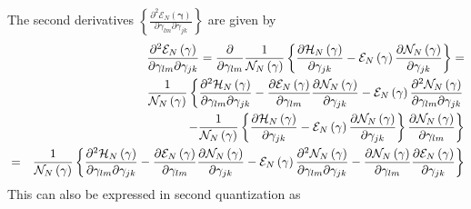 \documentclass[aps,preprint]{revtex4}
\begin{document}
The second derivatives $\left\{ \frac{\partial ^{2}\mathcal{E}_{N}\left( 
\mathbf{\gamma }\right) }{\partial \gamma _{lm}\partial \gamma _{jk}}%
\right\} $ are given by 
\begin{eqnarray}
&&\frac{\partial ^{2}\mathcal{E}_{N}\left( \mathbf{\gamma }\right) }{%
\partial \gamma _{lm}\partial \gamma _{jk}}=\frac{\partial }{\partial \gamma
_{lm}}\frac{1}{\mathcal{N}_{N}\left( \mathbf{\gamma }\right) }\left\{ \frac{%
\partial \mathcal{H}_{N}\left( \mathbf{\gamma }\right) }{\partial \gamma
_{jk}}-\mathcal{E}_{N}\left( \mathbf{\gamma }\right) \frac{\partial \mathcal{%
N}_{N}\left( \mathbf{\gamma }\right) }{\partial \gamma _{jk}}\right\} = 
\nonumber \\
&&\frac{1}{\mathcal{N}_{N}\left( \mathbf{\gamma }\right) }\left\{ \frac{%
\partial ^{2}\mathcal{H}_{N}\left( \mathbf{\gamma }\right) }{\partial \gamma
_{lm}\partial \gamma _{jk}}-\frac{\partial \mathcal{E}_{N}\left( \mathbf{%
\gamma }\right) }{\partial \gamma _{lm}}\frac{\partial \mathcal{N}_{N}\left( 
\mathbf{\gamma }\right) }{\partial \gamma _{jk}}-\mathcal{E}_{N}\left( 
\mathbf{\gamma }\right) \frac{\partial ^{2}\mathcal{N}_{N}\left( \mathbf{%
\gamma }\right) }{\partial \gamma _{lm}\partial \gamma _{jk}}\right. 
\nonumber \\
&&\qquad \qquad \qquad \qquad \left. -\frac{1}{\mathcal{N}_{N}\left( \mathbf{%
\gamma }\right) }\left\{ \frac{\partial \mathcal{H}_{N}\left( \mathbf{\gamma 
}\right) }{\partial \gamma _{jk}}-\mathcal{E}_{N}\left( \mathbf{\gamma }%
\right) \frac{\partial \mathcal{N}_{N}\left( \mathbf{\gamma }\right) }{%
\partial \gamma _{jk}}\right\} \frac{\partial \mathcal{N}_{N}\left( \mathbf{%
\gamma }\right) }{\partial \gamma _{lm}}\right\}  \nonumber \\
&=&\frac{1}{\mathcal{N}_{N}\left( \mathbf{\gamma }\right) }\left\{ \frac{%
\partial ^{2}\mathcal{H}_{N}\left( \mathbf{\gamma }\right) }{\partial \gamma
_{lm}\partial \gamma _{jk}}-\frac{\partial \mathcal{E}_{N}\left( \mathbf{%
\gamma }\right) }{\partial \gamma _{lm}}\frac{\partial \mathcal{N}_{N}\left( 
\mathbf{\gamma }\right) }{\partial \gamma _{jk}}-\mathcal{E}_{N}\left( 
\mathbf{\gamma }\right) \frac{\partial ^{2}\mathcal{N}_{N}\left( \mathbf{%
\gamma }\right) }{\partial \gamma _{lm}\partial \gamma _{jk}}-\frac{\partial 
\mathcal{N}_{N}\left( \mathbf{\gamma }\right) }{\partial \gamma _{lm}}\frac{%
\partial \mathcal{E}_{N}\left( \mathbf{\gamma }\right) }{\partial \gamma
_{jk}}\right\}
\end{eqnarray}%
This can also be expressed in second quantization as 
\end{document}
